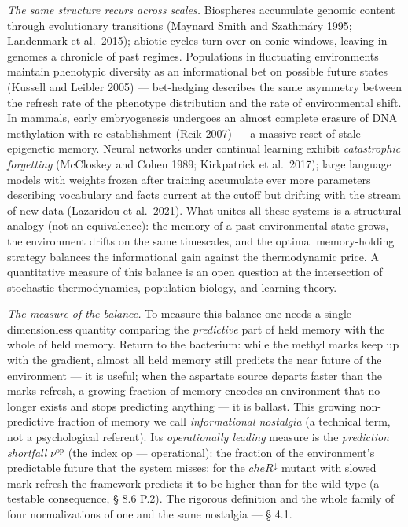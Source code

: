 \documentclass[pdflatex,sn-mathphys-ay]{sn-jnl}
\begin{document}
\emph{The same structure recurs across scales.} Biospheres accumulate genomic content through evolutionary transitions (Maynard Smith and Szathmáry 1995; Landenmark et al.~2015); abiotic cycles turn over on eonic windows, leaving in genomes a chronicle of past regimes. Populations in fluctuating environments maintain phenotypic diversity as an informational bet on possible future states (Kussell and Leibler 2005) --- bet-hedging describes the same asymmetry between the refresh rate of the phenotype distribution and the rate of environmental shift. In mammals, early embryogenesis undergoes an almost complete erasure of DNA methylation with re-establishment (Reik 2007) --- a massive reset of stale epigenetic memory. Neural networks under continual learning exhibit \emph{catastrophic forgetting} (McCloskey and Cohen 1989; Kirkpatrick et al.~2017); large language models with weights frozen after training accumulate ever more parameters describing vocabulary and facts current at the cutoff but drifting with the stream of new data (Lazaridou et al.~2021). What unites all these systems is a structural analogy (not an equivalence): the memory of a past environmental state grows, the environment drifts on the same timescales, and the optimal memory-holding strategy balances the informational gain against the thermodynamic price. A quantitative measure of this balance is an open question at the intersection of stochastic thermodynamics, population biology, and learning theory.



\emph{The measure of the balance.} To measure this balance one needs a single dimensionless quantity comparing the \emph{predictive} part of held memory with the whole of held memory. Return to the bacterium: while the methyl marks keep up with the gradient, almost all held memory still predicts the near future of the environment --- it is useful; when the aspartate source departs faster than the marks refresh, a growing fraction of memory encodes an environment that no longer exists and stops predicting anything --- it is ballast. This growing non-predictive fraction of memory we call \emph{informational nostalgia} (a technical term, not a psychological referent). Its \emph{operationally leading} measure is the \emph{prediction shortfall} \(\nu^{\text{op}}\) (the index op --- operational): the fraction of the environment's predictable future that the system misses; for the \(cheR^{\downarrow}\) mutant with slowed mark refresh the framework predicts it to be higher than for the wild type (a testable consequence, § 8.6 P.2). The rigorous definition and the whole family of four normalizations of one and the same nostalgia --- § 4.1.
\end{document}
